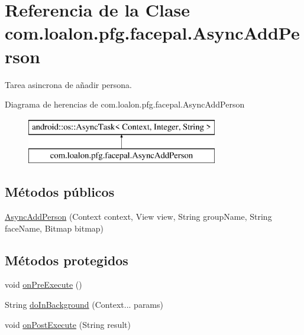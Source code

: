 \hypertarget{classcom_1_1loalon_1_1pfg_1_1facepal_1_1_async_add_person}{}\section{Referencia de la Clase com.\+loalon.\+pfg.\+facepal.\+Async\+Add\+Person}
\label{classcom_1_1loalon_1_1pfg_1_1facepal_1_1_async_add_person}


Tarea asincrona de añadir persona.  


Diagrama de herencias de com.\+loalon.\+pfg.\+facepal.\+Async\+Add\+Person\begin{figure}[H]
\begin{center}
\leavevmode
\includegraphics[height=2.000000cm]{classcom_1_1loalon_1_1pfg_1_1facepal_1_1_async_add_person}
\end{center}
\end{figure}
\subsection*{Métodos públicos}
\begin{DoxyCompactItemize}
\item 
\mbox{\hyperlink{classcom_1_1loalon_1_1pfg_1_1facepal_1_1_async_add_person_aa88098f2f6ee436d7b26b7d9d5432a58}{Async\+Add\+Person}} (Context context, View view, String group\+Name, String face\+Name, Bitmap bitmap)
\end{DoxyCompactItemize}
\subsection*{Métodos protegidos}
\begin{DoxyCompactItemize}
\item 
void \mbox{\hyperlink{classcom_1_1loalon_1_1pfg_1_1facepal_1_1_async_add_person_a6af153108c502542ce6465006795a1b2}{on\+Pre\+Execute}} ()
\item 
String \mbox{\hyperlink{classcom_1_1loalon_1_1pfg_1_1facepal_1_1_async_add_person_a15123e65e39ef6a2453bad1efd536614}{do\+In\+Background}} (Context... params)
\item 
void \mbox{\hyperlink{classcom_1_1loalon_1_1pfg_1_1facepal_1_1_async_add_person_a885607cbe0ea901fdc1d567da6067b89}{on\+Post\+Execute}} (String result)
\end{DoxyCompactItemize}


